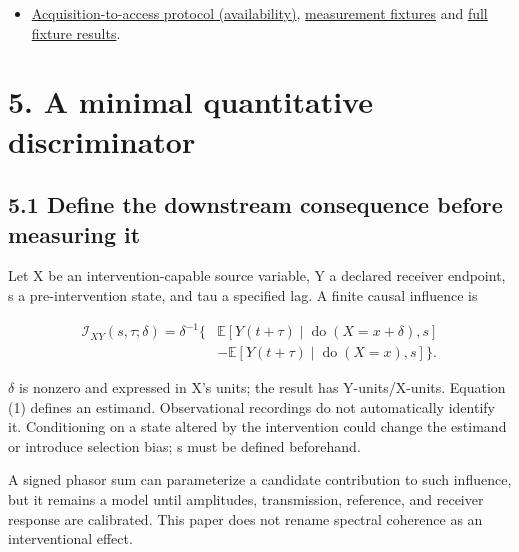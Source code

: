 \documentclass[
  american,
  11pt,
  letterpaper,
]{article}
\begin{document}
\begin{itemize}
\item
  \href{https://github.com/v5ma/v5ma.github.io/blob/master/papers/companions/learning-to-feel-v1.0/ARTIFACT-AVAILABILITY.md\#artifact-1}{Acquisition-to-access protocol (availability)}, \href{https://github.com/v5ma/v5ma.github.io/blob/master/papers/companions/learning-to-feel-v1.0/analysis/acquisition-access-check.mjs}{measurement fixtures} and \href{https://github.com/v5ma/v5ma.github.io/blob/master/papers/companions/learning-to-feel-v1.0/analysis/acquisition-access-results.json}{full fixture results}.
\end{itemize}

\section{5. A minimal quantitative discriminator}\label{a-minimal-quantitative-discriminator}

\subsection{5.1 Define the downstream consequence before measuring it}\label{define-the-downstream-consequence-before-measuring-it}

Let X be an intervention-capable source variable, Y a declared receiver endpoint, s a pre-intervention state, and tau a specified lag. A finite causal influence is

\begin{equation}
\begin{aligned}\mathcal I_{XY}(s,\tau;\delta)=\delta^{-1}\bigl\{&\mathbb E[Y(t+\tau)\mid\operatorname{do}(X=x+\delta),s]\\ &-\mathbb E[Y(t+\tau)\mid\operatorname{do}(X=x),s]\bigr\}.\end{aligned}\tag{1}
\end{equation}

\(\delta\) is nonzero and expressed in X's units; the result has Y-units/X-units. Equation (1) defines an estimand. Observational recordings do not automatically identify it. Conditioning on a state altered by the intervention could change the estimand or introduce selection bias; s must be defined beforehand.

A signed phasor sum can parameterize a candidate contribution to such influence, but it remains a model until amplitudes, transmission, reference, and receiver response are calibrated. This paper does not rename spectral coherence as an interventional effect.
\end{document}
